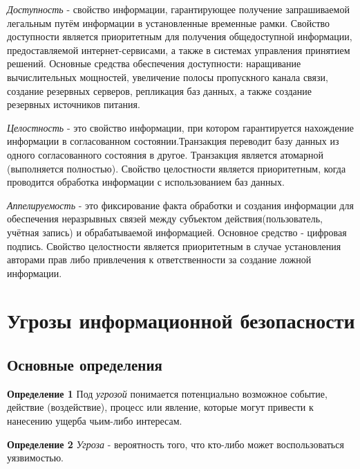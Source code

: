 \documentclass{article}
\begin{document}
\textit{Доступность} - свойство информации, гарантирующее получение запрашиваемой легальным путём информации в установленные временные рамки. Свойство доступности является приоритетным для получения общедоступной информации, предоставляемой интернет-сервисами, а также в системах управления принятием решений. Основные средства обеспечения доступности: наращивание вычислительных мощностей, увеличение полосы пропускного канала связи, создание резервных серверов, репликация баз данных, а также создание резервных источников питания.

\textit{Целостность} - это свойство информации, при котором гарантируется нахождение информации в согласованном состоянии.Транзакция переводит базу данных из одного согласованного состояния в другое. Транзакция является атомарной (выполняется полностью). Свойство целостности является приоритетным, когда проводится обработка информации с использованием баз данных.

\textit{Аппелируемость} - это фиксирование факта обработки и создания информации для обеспечения неразрывных связей между субъектом
действия(пользователь, учётная запись) и обрабатываемой информацией. Основное средство - цифровая подпись. Свойство целостности является приоритетным в случае установления авторами прав либо привлечения к ответственности за создание ложной информации.

\section{ Угрозы информационной безопасности}
\subsection{ Основные определения }
\textbf{Определение 1}
Под \textit{угрозой} понимается потенциально возможное событие, действие (воздействие), процесс или явление, которые могут привести к нанесению ущерба чьим-либо интересам.

\textbf{Определение 2}
\textit{Угроза} - вероятность того, что кто-либо может воспользоваться уязвимостью.
\end{document}
